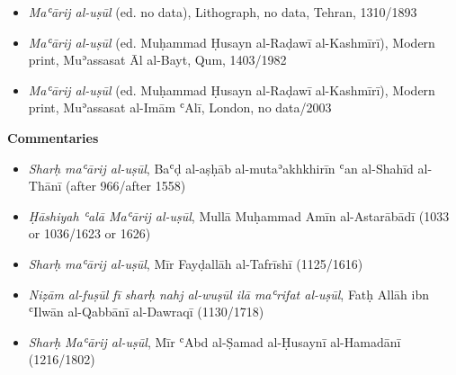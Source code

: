 \documentclass{article}
\begin{document}
\begin{enumerate}
\begin{itemize}
        \item \emph{Maʿārij al-uṣūl} (ed. no data), Lithograph, no data, Tehran, 1310/1893
        
        \item \emph{Maʿārij al-uṣūl} (ed. Muḥammad Ḥusayn al-Raḍawī al-Kashmīrī), Modern print, Muʾassasat Āl al-Bayt, Qum, 1403/1982
        
        \item \emph{Maʿārij al-uṣūl} (ed. Muḥammad Ḥusayn al-Raḍawī al-Kashmīrī), Modern print, Muʾassasat al-Imām ʿAlī, London, no data/2003
        \end{itemize}
\textbf{Commentaries}
\begin{itemize}
              \item \emph{Sharḥ maʿārij al-uṣūl}, Baʿḍ al-aṣḥāb al-mutaʾakhkhirīn ʿan al-Shahīd al-Thānī (after 966/after 1558)
            
              \item \emph{Ḥāshiyah ʿalā Maʿārij al-uṣūl}, Mullā Muḥammad Amīn al-Astarābādī (1033 or 1036/1623 or 1626)
            
              \item \emph{Sharḥ maʿārij al-uṣūl}, Mīr Fayḍallāh al-Tafrīshī (1125/1616)
            
              \item \emph{Niẓām al-fuṣūl fī sharḥ nahj al-wuṣūl ilā maʿrifat al-uṣūl}, Fatḥ Allāh ibn ʿIlwān al-Qabbānī al-Dawraqī (1130/1718)
            
              \item \emph{Sharḥ Maʿārij al-uṣūl}, Mīr ʿAbd al-Ṣamad al-Ḥusaynī al-Hamadānī (1216/1802)
            \end{itemize}


\end{enumerate}
\end{document}
